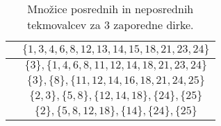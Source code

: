 \documentclass[a4paper, 12pt]{book}
\begin{document}
\begin{table}
\begin{center}
\begin{tabular}{ |c|c| }
        \hline
            [12,14] & $\{1, 3, 4, 6, 8, 12, 13, 14, 15, 18, 21, 23, 24\}$ \\ 
        \hline
            [13,15] & $\{3\}, \{1, 4, 6, 8, 11, 12, 14, 18, 21, 23, 24\}$ \\ 
        \hline
            [14,16] & $\{3\}, \{8\}, \{11, 12, 14, 16, 18, 21, 24, 25\}$ \\ 
        \hline
            [15,17] & $\{2, 3\}, \{5, 8\}, \{12, 14, 18\}, \{24\}, \{25\}$ \\ 
        \hline
            [16,18] & $\{2\}, \{5, 8, 12, 18\}, \{14\}, \{24\}, \{25\}$ \\ 
        \hline
    \end{tabular}
\end{center}
\caption{ Množice posrednih in neposrednih tekmovalcev za 3 zaporedne dirke. }
\label{tbl:tabelaPosrednihNeposrednihTekmovalcev3}
\end{table}
\end{document}
